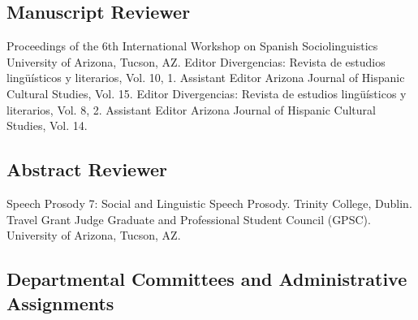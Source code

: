 \documentclass[11pt,letterpaper]{moderncv}
\begin{document}
\subsection{Manuscript Reviewer}

        {Proceedings of the 6th International Workshop on Spanish Sociolinguistics}
        {}
        {}
        {}
        {University of Arizona, Tucson, AZ.}
        {Editor}
        {Divergencias: Revista de estudios ling\"u\'isticos y literarios, Vol. 10, 1.}
        {}
        {}
        {}
        {Assistant Editor}
        {Arizona Journal of Hispanic Cultural Studies, Vol. 15.}
        {}
        {}
        {}
        {Editor}
        {Divergencias: Revista de estudios ling\"u\'isticos y literarios, Vol. 8, 2.}
        {}
        {}
        {}
        {Assistant Editor}
        {Arizona Journal of Hispanic Cultural Studies, Vol. 14.}
        {}
        {}
        {}

\subsection{Abstract Reviewer}

        {Speech Prosody 7: Social and Linguistic Speech Prosody.}
        {}
        {}
        {}
        {Trinity College, Dublin.}
        {Travel Grant Judge}
        {Graduate and Professional Student Council (GPSC).}
        {}
        {}
        {University of Arizona, Tucson, AZ.}

\subsection{Departmental Committees and Administrative Assignments}
\end{document}

